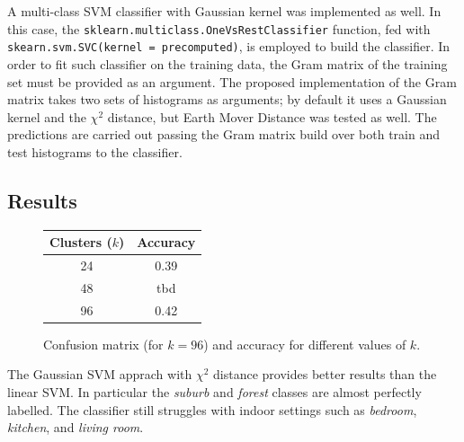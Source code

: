\documentclass[12pt]{article}
\begin{document}
  A multi-class SVM classifier with Gaussian kernel was implemented as well. In this case, the \texttt{sklearn.multiclass.OneVsRestClassifier} function, fed with \texttt{skearn.svm.SVC(kernel = precomputed)}, is employed to build the classifier. In order to fit such classifier on the training data, the Gram matrix of the training set must be provided as an argument. The proposed implementation of the Gram matrix takes two sets of histograms as arguments; by default it uses a Gaussian kernel and the \( \chi^2 \) distance, but Earth Mover Distance was tested as well. The predictions are carried out passing the Gram matrix build over both train and test histograms to the classifier.


  \subsection*{Results}

  \begin{figure}[H]
    \centering
    \caption*{Confusion matrix (for \( k = 96 \)) and accuracy for different values of \( k \).}
    \quad\quad\quad
    \begin{tabular}[b]{cc}
			\toprule
      Clusters (\( k \)) & Accuracy \\
      \midrule
      24  & 0.39 \\
      48  & tbd \\
      96  & 0.42 \\
      \bottomrule
    \end{tabular}
  \end{figure}

  The Gaussian SVM apprach with \( \chi^2 \) distance provides better results than the linear SVM. In particular the \textit{suburb} and \textit{forest} classes are almost perfectly labelled. The classifier still struggles with indoor settings such as \textit{bedroom}, \textit{kitchen}, and \textit{living room}.
\end{document}
